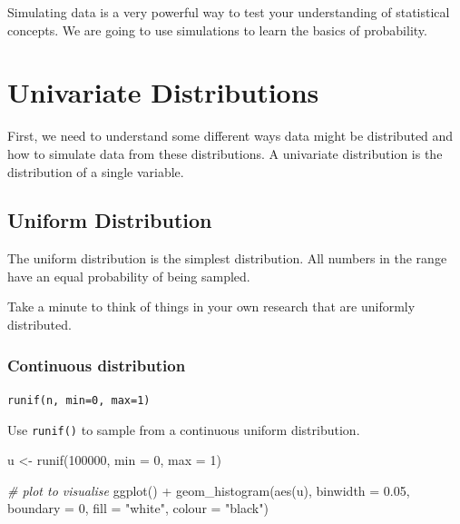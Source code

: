 \documentclass[
  oneside]{book}
\newenvironment{Shaded}{\begin{snugshade}}{\end{snugshade}}
\newcommand{\AttributeTok}[1]{\textcolor[rgb]{0.77,0.63,0.00}{#1}}
\newcommand{\CommentTok}[1]{\textcolor[rgb]{0.56,0.35,0.01}{\textit{#1}}}
\newcommand{\DecValTok}[1]{\textcolor[rgb]{0.00,0.00,0.81}{#1}}
\newcommand{\FloatTok}[1]{\textcolor[rgb]{0.00,0.00,0.81}{#1}}
\newcommand{\FunctionTok}[1]{\textcolor[rgb]{0.00,0.00,0.00}{#1}}
\newcommand{\NormalTok}[1]{#1}
\newcommand{\OtherTok}[1]{\textcolor[rgb]{0.56,0.35,0.01}{#1}}
\newcommand{\SpecialCharTok}[1]{\textcolor[rgb]{0.00,0.00,0.00}{#1}}
\newcommand{\StringTok}[1]{\textcolor[rgb]{0.31,0.60,0.02}{#1}}
\begin{document}
Simulating data is a very powerful way to test your understanding of statistical concepts. We are going to use simulations to learn the basics of probability.

\hypertarget{univariate-distributions}{%
\section{Univariate Distributions}\label{univariate-distributions}}

First, we need to understand some different ways data might be distributed and how to simulate data from these distributions. A univariate distribution is the distribution of a single variable.

\hypertarget{uniform}{%
\subsection{Uniform Distribution}\label{uniform}}

The uniform distribution is the simplest distribution. All numbers in the range have an equal probability of being sampled.

\begin{try}
Take a minute to think of things in your own research that are uniformly distributed.

\end{try}

\hypertarget{continuous-distribution}{%
\subsubsection{Continuous distribution}\label{continuous-distribution}}

\texttt{runif(n,\ min=0,\ max=1)}

Use \texttt{runif()} to sample from a continuous uniform distribution.

\begin{Shaded}
\begin{Highlighting}[]
\NormalTok{u }\OtherTok{\textless{}{-}} \FunctionTok{runif}\NormalTok{(}\DecValTok{100000}\NormalTok{, }\AttributeTok{min =} \DecValTok{0}\NormalTok{, }\AttributeTok{max =} \DecValTok{1}\NormalTok{)}

\CommentTok{\# plot to visualise}
\FunctionTok{ggplot}\NormalTok{() }\SpecialCharTok{+} 
  \FunctionTok{geom\_histogram}\NormalTok{(}\FunctionTok{aes}\NormalTok{(u), }\AttributeTok{binwidth =} \FloatTok{0.05}\NormalTok{, }\AttributeTok{boundary =} \DecValTok{0}\NormalTok{,}
                 \AttributeTok{fill =} \StringTok{"white"}\NormalTok{, }\AttributeTok{colour =} \StringTok{"black"}\NormalTok{)}
\end{Highlighting}
\end{Shaded}
\end{document}

